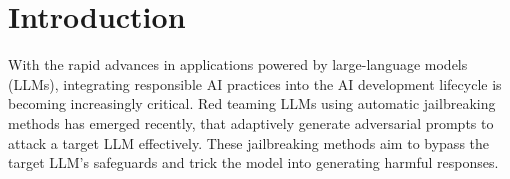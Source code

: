 \section{Introduction}
\label{sec:introduction}

\begin{table*}[bp]
\caption{Comparison of \bedrockfuzz versus GPTFuzzer~\cite{yu2023gptfuzzer} on 200 harmful behaviors from HarmBench~\cite{mazeika2024harmbench} text standard dataset with a target model query budget of 4000.}
\label{tab:rq1}
\end{table*}

With the rapid advances in applications powered by large-language models (LLMs), integrating responsible AI practices into the AI development lifecycle is becoming increasingly critical.
Red teaming LLMs using automatic jailbreaking methods has emerged recently, that adaptively generate adversarial prompts to attack a target LLM effectively.
These jailbreaking methods aim to bypass the target LLM's safeguards and trick the model into generating harmful responses.


